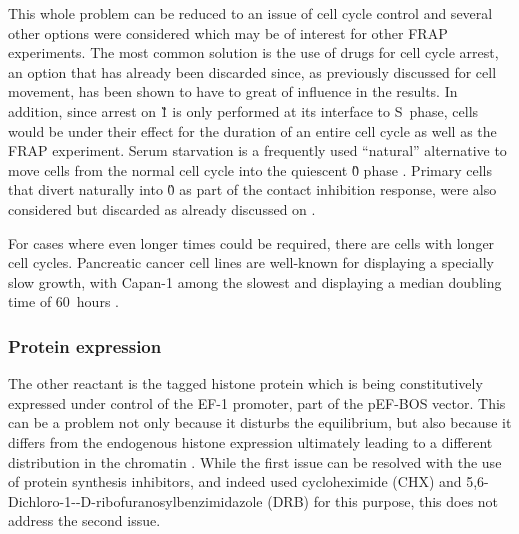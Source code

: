       This whole problem can be reduced to an issue of cell cycle control and
      several other options were considered which may be of interest for
      other FRAP experiments. The most common solution is the use
      of drugs for cell cycle arrest, an option that has already been
      discarded since, as previously discussed for cell movement, has been
      shown to have to great of influence in the results.
      In addition, since arrest on \G1{} is only
      performed at its interface to S~phase, cells would be under their
      effect for the duration of an entire cell cycle as well as the FRAP
      experiment.
      Serum starvation is a frequently used ``natural''
      alternative to move cells from the normal cell cycle into the
      quiescent \G0{} phase \citep{SerumStarvation}. 
      Primary cells that divert naturally into \G0{} as part of
      the contact inhibition response, were also considered but
      discarded as already discussed on .

      For cases where even longer times could be required, there are cells
      with longer cell cycles. Pancreatic cancer cell lines are well-known
      for displaying a specially slow growth, with Capan-1 among the slowest
      and displaying a median doubling time of 60~hours \citep{PancreaticCells}.

    \subsubsection{Protein expression}

      The other reactant is the tagged histone protein which is being
      constitutively expressed under control of the EF-1\textalpha{} promoter,
      part of the pEF-BOS vector. This can be a problem not only because it
      disturbs the equilibrium, but also because it differs from the endogenous
      histone expression ultimately leading to a different distribution in the
      chromatin \citep{KimuraCook}.
      While the first issue can be resolved with the use of protein synthesis
      inhibitors, and indeed \cite{KimuraCook} used cycloheximide (CHX) and
      5,6-Dichloro-1-\textbeta{}-D-ribofuranosylbenzimidazole (DRB) for this purpose,
      this does not address the second issue.

